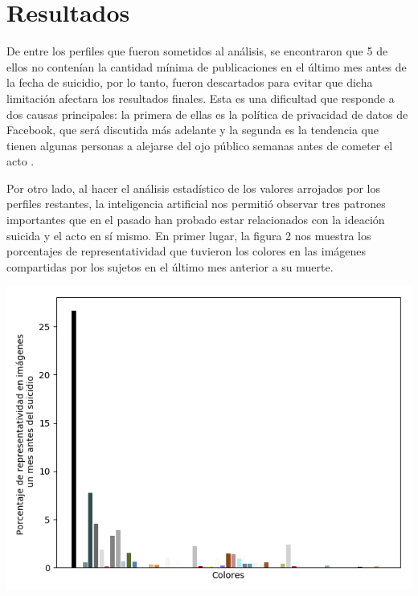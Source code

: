 \documentclass[12pt, man, donotrepeattitle, letterpaper]{apa6}
\begin{document}
    \section{Resultados}
    De entre los perfiles que fueron sometidos al análisis, se encontraron que 5 de ellos no contenían la cantidad mínima de publicaciones en el último mes antes de la fecha de suicidio, por lo tanto, fueron descartados para evitar que dicha limitación afectara los resultados finales. Esta es una dificultad que responde a dos causas principales: la primera de ellas es la política de privacidad de datos de Facebook, que será discutida más adelante y la segunda es la tendencia que tienen algunas personas a alejarse del ojo público semanas antes de cometer el acto \parencite{SuicidalB}.
    
    
    Por otro lado, al hacer el análisis estadístico de los valores arrojados por los perfiles restantes, la inteligencia artificial nos permitió observar tres patrones importantes que en el pasado han probado estar relacionados con la ideación suicida y el acto en sí mismo. En primer lugar, la figura 2 nos muestra los porcentajes de representatividad que tuvieron los colores en las imágenes compartidas por los sujetos en el último mes anterior a su muerte.
    
    \begin{center}
        \begin{minipage}{0.8\linewidth}
            \includegraphics[width=\linewidth]{images/colors_global}
        \end{minipage}
    \end{center}
\end{document}
